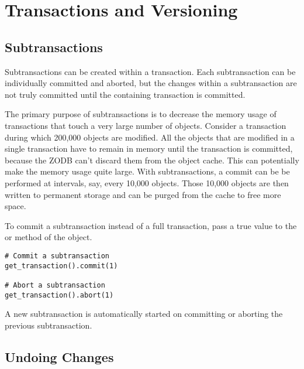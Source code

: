   

\section{Transactions and Versioning}


\subsection{Subtransactions}

Subtransactions can be created within a transaction.  Each
subtransaction can be individually committed and aborted, but the
changes within a subtransaction are not truly committed until the
containing transaction is committed.

The primary purpose of subtransactions is to decrease the memory usage
of transactions that touch a very large number of objects.  Consider a
transaction during which 200,000 objects are modified.  All the
objects that are modified in a single transaction have to remain in
memory until the transaction is committed, because the ZODB can't
discard them from the object cache.  This can potentially make the
memory usage quite large.  With subtransactions, a commit can be be
performed at intervals, say, every 10,000 objects.  Those 10,000
objects are then written to permanent storage and can be purged from
the cache to free more space.

To commit a subtransaction instead of a full transaction, 
pass a true value to the 
or  method of the  object.

\begin{verbatim}
# Commit a subtransaction
get_transaction().commit(1)     

# Abort a subtransaction
get_transaction().abort(1)   
\end{verbatim}

A new subtransaction is automatically started on committing or
aborting the previous subtransaction.


\subsection{Undoing Changes}

